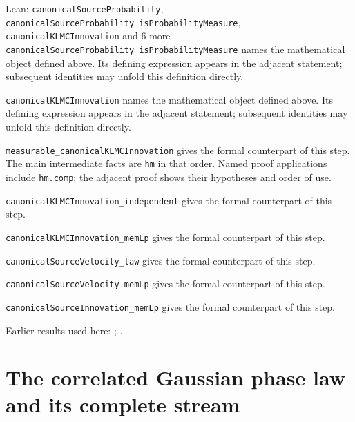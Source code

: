 \documentclass[11pt,a4paper]{article}
\begin{document}
\begin{leanbox}{Lean: \texttt{canonicalSourceProbability}, \texttt{canonicalSourceProbability\_\allowbreak{}isProbabilityMeasure}, \texttt{canonicalKLMCInnovation} and 6 more}
\texttt{canonical\allowbreak{}Source\allowbreak{}Probability\_\allowbreak{}is\allowbreak{}Probability\allowbreak{}Measure} names the mathematical object defined above. Its defining expression appears in the adjacent statement; subsequent identities may unfold this definition directly.




\texttt{canonical\allowbreak{}KLMCInnovation} names the mathematical object defined above. Its defining expression appears in the adjacent statement; subsequent identities may unfold this definition directly.




\texttt{measurable\_\allowbreak{}canonical\allowbreak{}KLMCInnovation} gives the formal counterpart of this step. The main intermediate facts are \texttt{hm} in that order. Named proof applications include \texttt{hm.\allowbreak{}comp}; the adjacent proof shows their hypotheses and order of use.




\texttt{canonical\allowbreak{}KLMCInnovation\_\allowbreak{}independent} gives the formal counterpart of this step.




\texttt{canonical\allowbreak{}KLMCInnovation\_\allowbreak{}mem\allowbreak{}Lp} gives the formal counterpart of this step.




\texttt{canonical\allowbreak{}Source\allowbreak{}Velocity\_\allowbreak{}law} gives the formal counterpart of this step.




\texttt{canonical\allowbreak{}Source\allowbreak{}Velocity\_\allowbreak{}mem\allowbreak{}Lp} gives the formal counterpart of this step.




\texttt{canonical\allowbreak{}Source\allowbreak{}Innovation\_\allowbreak{}mem\allowbreak{}Lp} gives the formal counterpart of this step.
\end{leanbox}


Earlier results used here: \cite[Section~3.8.16]{LangevinLean2026ULASC}; \cite[Section~3.8.17]{LangevinLean2026ULASC}.

\section{\texorpdfstring{The correlated Gaussian phase law and its complete stream}{The correlated Gaussian phase law and its complete stream}}
\end{document}
